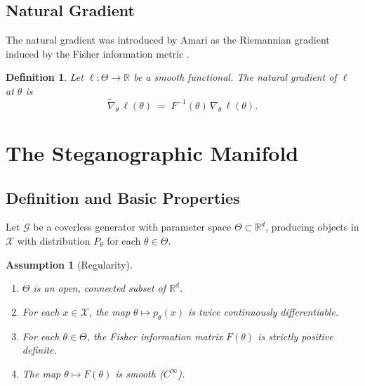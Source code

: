 \documentclass[a4paper,fleqn]{cas-dc}
\newtheorem{assumption}{Assumption}
\newtheorem{definition}{Definition}
\newcommand{\R}{\mathbb{R}}
\newcommand{\calG}{\mathcal{G}}
\newcommand{\natgrad}{\widetilde{\nabla}}
\begin{document}
\subsection{Natural Gradient}

The natural gradient was introduced by Amari as the Riemannian gradient induced
by the Fisher information metric \cite{amari1998natural}.

\begin{definition}%
  \label{def:natural_gradient}
  Let $\ell:\Theta\to\R$ be a smooth functional.
  The \emph{natural gradient} of $\ell$ at $\theta$ is
  \begin{equation}
    \natgrad_\theta\,\ell(\theta)
    \;=\; F^{-1}(\theta)\,\nabla_\theta\,\ell(\theta).
    \label{eq:natural_gradient}
  \end{equation}
\end{definition}
\section{The Steganographic Manifold}
\label{sec:manifold}

\subsection{Definition and Basic Properties}

Let $\calG$ be a coverless generator with parameter space
$\Theta\subset\R^d$, producing objects in $\mathcal{X}$ with distribution
$P_\theta$ for each $\theta\in\Theta$.

\begin{assumption}[Regularity]
  \label{ass:regularity}
  \begin{enumerate}
    \item[(i)] $\Theta$ is an open, connected subset of $\R^d$.
    \item[(ii)] For each $x\in\mathcal{X}$, the map $\theta\mapsto p_\theta(x)$
          is twice continuously differentiable.
    \item[(iii)] For each $\theta\in\Theta$, the Fisher information matrix
          $F(\theta)$ is strictly positive definite.
    \item[(iv)] The map $\theta\mapsto F(\theta)$ is smooth ($C^\infty$).
  \end{enumerate}
\end{assumption}
\end{document}
